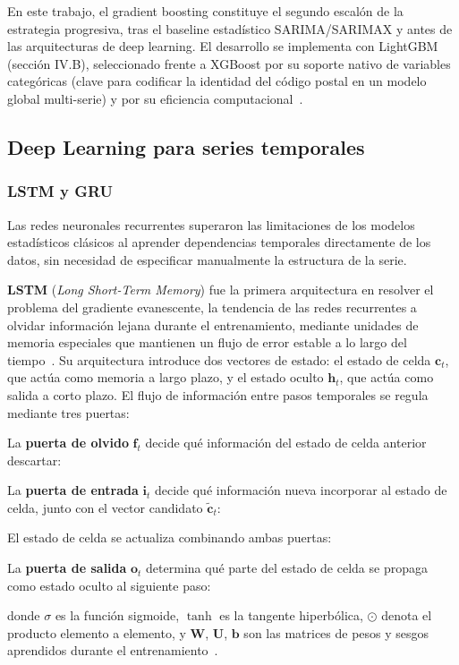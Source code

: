 \documentclass[12pt, a4paper]{article}
\begin{document}
En este trabajo, el gradient boosting constituye el segundo escalón de la estrategia progresiva, tras el baseline estadístico SARIMA/SARIMAX y antes de las arquitecturas de deep learning. El desarrollo se implementa con LightGBM (sección IV.B), seleccionado frente a XGBoost por su soporte nativo de variables categóricas (clave para codificar la identidad del código postal en un modelo global multi-serie) y por su eficiencia computacional~\cite{ke2017}.

\subsection{Deep Learning para series temporales}


\subsubsection{LSTM y GRU}


Las redes neuronales recurrentes superaron las limitaciones de los modelos estadísticos clásicos al aprender dependencias temporales directamente de los datos, sin necesidad de especificar manualmente la estructura de la serie.

\textbf{LSTM} (\textit{Long Short-Term Memory}) fue la primera arquitectura en resolver el problema del gradiente evanescente, la tendencia de las redes recurrentes a olvidar información lejana durante el entrenamiento, mediante unidades de memoria especiales que mantienen un flujo de error estable a lo largo del tiempo~\cite{hochreiter1997}. Su arquitectura introduce dos vectores de estado: el estado de celda $\mathbf{c}_t$, que actúa como memoria a largo plazo, y el estado oculto $\mathbf{h}_t$, que actúa como salida a corto plazo. El flujo de información entre pasos temporales se regula mediante tres puertas:

La \textbf{puerta de olvido} $\mathbf{f}_t$ decide qué información del estado de celda anterior descartar:

La \textbf{puerta de entrada} $\mathbf{i}_t$ decide qué información nueva incorporar al estado de celda, junto con el vector candidato $\tilde{\mathbf{c}}_t$:

El estado de celda se actualiza combinando ambas puertas:

La \textbf{puerta de salida} $\mathbf{o}_t$ determina qué parte del estado de celda se propaga como estado oculto al siguiente paso:

donde $\sigma$ es la función sigmoide, $\tanh$ es la tangente hiperbólica, $\odot$ denota el producto elemento a elemento, y $\mathbf{W}$, $\mathbf{U}$, $\mathbf{b}$ son las matrices de pesos y sesgos aprendidos durante el entrenamiento~\cite{hochreiter1997}.
\end{document}
